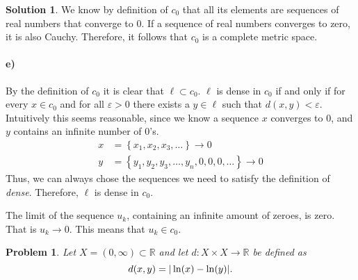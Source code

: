 \documentclass[a4paper]{article}
\newtheorem{prb}{Problem}
\theoremstyle{definition}
\newtheorem{sol}{Solution}
\begin{document}
\begin{sol}
We know by definition of $c_0$ that all its elements are sequences of real
numbers that converge to $0$.  If a sequence of real numbers converges to zero,
it is also Cauchy. Therefore, it follows that $c_0$ is a complete metric space.

\paragraph{e)}

By the definition of $c_0$ it is clear that $\ell \subset c_0$.  $\ell$ is
dense in $c_0$ if and only if for every $x \in c_0$ and for all $\varepsilon >
0$ there exists a $y \in \ell$ such that $d(x, y) < \varepsilon$.  Intuitively
this seems reasonable, since we know a sequence $x$ converges to $0$, and $y$
contains an infinite number of $0$'s.
\begin{align*}
x &= \left\{ x_1, x_2, x_3, \ldots \right\} \longrightarrow 0\\
y &= \left\{ y_1, y_2, y_3, \ldots, y_n, 0, 0, 0, \ldots \right\} \longrightarrow 0
\end{align*}
Thus, we can always chose the sequences we need to satisfy the definition of
\textit{dense}.  Therefore, $\ell$ is dense in $c_0$.

The limit of the sequence $u_k$, containing an infinite amount of zeroes, is
zero.  That is $u_k \longrightarrow 0$. This means that $u_k \in c_0$.
\end{sol}

\begin{prb}
  Let $X = \left( 0, \infty \right) \subset \mathbb{R}$ and let $d : X \times X \longrightarrow \mathbb{R}$ be defined as
  \begin{equation}
    \notag
    d(x, y) = | \ln(x) - \ln(y)|.
  \end{equation}
\end{prb}
\end{document}
